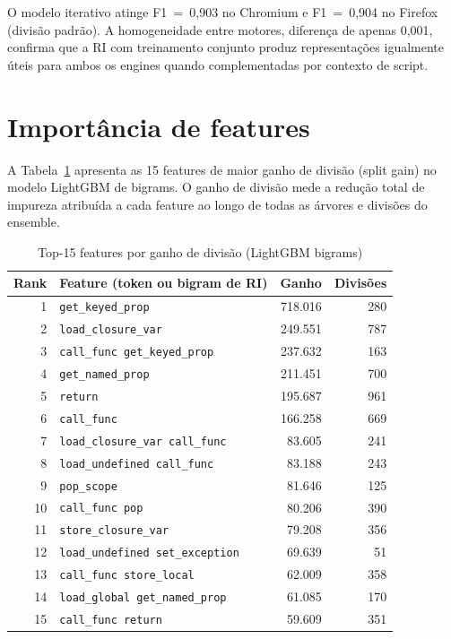 O modelo iterativo atinge F1~=~0,903 no Chromium e F1~=~0,904
no Firefox (divisão padrão). A homogeneidade entre motores, diferença de apenas 0,001, confirma
que a RI com treinamento conjunto produz representações igualmente úteis para ambos
os engines quando complementadas por contexto de script.

\section{Importância de features}
\label{sec:features}

A Tabela~\ref{tab:features-imp} apresenta as 15 features de maior ganho de divisão
(split gain) no modelo LightGBM de bigrams. O ganho de divisão mede a
redução total de impureza atribuída a cada feature ao longo de todas as árvores e
divisões do ensemble.

\begin{table}[htb]
\centering
\caption{Top-15 features por ganho de divisão (LightGBM bigrams)}
\label{tab:features-imp}
\begin{tabular}{rlrr}
\toprule
\textbf{Rank} & \textbf{Feature (token ou bigram de RI)} & \textbf{Ganho} & \textbf{Divisões} \\
\midrule
 1 & \texttt{get\_keyed\_prop}                  & 718.016 &  280 \\
 2 & \texttt{load\_closure\_var}                & 249.551 &  787 \\
 3 & \texttt{call\_func get\_keyed\_prop}        & 237.632 &  163 \\
 4 & \texttt{get\_named\_prop}                  & 211.451 &  700 \\
 5 & \texttt{return}                            & 195.687 &  961 \\
 6 & \texttt{call\_func}                        & 166.258 &  669 \\
 7 & \texttt{load\_closure\_var call\_func}     &  83.605 &  241 \\
 8 & \texttt{load\_undefined call\_func}        &  83.188 &  243 \\
 9 & \texttt{pop\_scope}                        &  81.646 &  125 \\
10 & \texttt{call\_func pop}                    &  80.206 &  390 \\
11 & \texttt{store\_closure\_var}               &  79.208 &  356 \\
12 & \texttt{load\_undefined set\_exception}    &  69.639 &   51 \\
13 & \texttt{call\_func store\_local}           &  62.009 &  358 \\
14 & \texttt{load\_global get\_named\_prop}     &  61.085 &  170 \\
15 & \texttt{call\_func return}                 &  59.609 &  351 \\
\bottomrule
\end{tabular}

\end{table}

